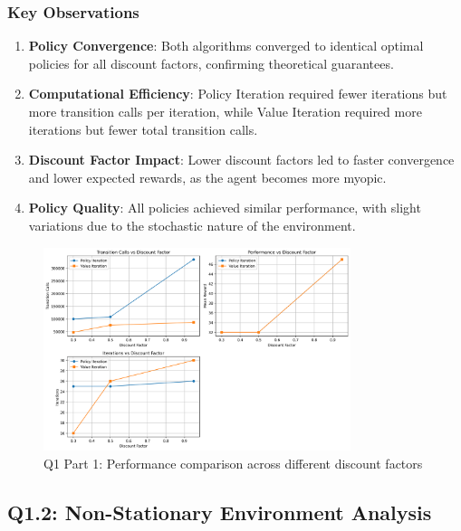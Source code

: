 \documentclass[12pt]{article}
\begin{document}
\subsubsection{Key Observations}

\begin{enumerate}
    \item \textbf{Policy Convergence}: Both algorithms converged to identical optimal policies for all discount factors, confirming theoretical guarantees.
    
    \item \textbf{Computational Efficiency}: Policy Iteration required fewer iterations but more transition calls per iteration, while Value Iteration required more iterations but fewer total transition calls.
    
    \item \textbf{Discount Factor Impact}: Lower discount factors led to faster convergence and lower expected rewards, as the agent becomes more myopic.
    
    \item \textbf{Policy Quality}: All policies achieved similar performance, with slight variations due to the stochastic nature of the environment.
\end{enumerate}

\begin{figure}[H]
\centering
\includegraphics[width=0.8\textwidth]{../Q1/part1/q1_part1_results.png}
\caption{Q1 Part 1: Performance comparison across different discount factors}
\end{figure}

\subsection{Q1.2: Non-Stationary Environment Analysis}
\end{document}
